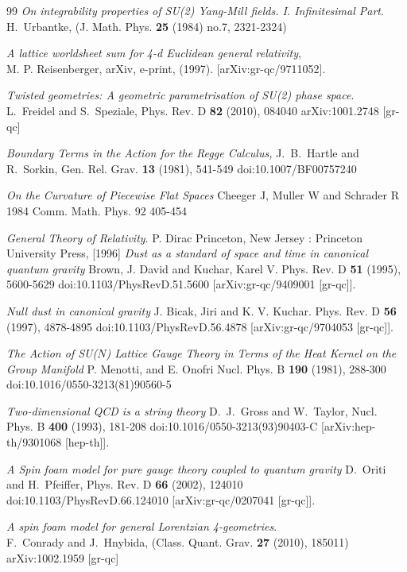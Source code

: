 \documentclass{article}
\begin{document}
\begin{thebibliography}{99}
\emph{On integrability properties of SU(2) Yang-Mill fields. I. Infinitesimal Part}.\\
H.~Urbantke,
(J. Math. Phys. \textbf{25} (1984) no.7, 2321-2324)


\emph{A lattice worldsheet sum for 4-d Euclidean general relativity},\\
M. P. Reisenberger,
arXiv, e-print,
(1997). [arXiv:gr-qc/9711052].


\emph{Twisted geometries: A geometric parametrisation of SU(2) phase space}.\\
L.~Freidel and S.~Speziale,
Phys. Rev. D \textbf{82} (2010), 084040
arXiv:1001.2748 [gr-qc]


\emph{Boundary Terms in the Action for the Regge Calculus,}
J.~B.~Hartle and R.~Sorkin,
Gen. Rel. Grav. \textbf{13} (1981), 541-549
doi:10.1007/BF00757240

\emph{On the Curvature of Piecewise Flat Spaces}
Cheeger J, Muller W and Schrader R 1984
Comm. Math. Phys. 92 405-454

\emph{General Theory of Relativity}.
P. Dirac
Princeton, New Jersey : Princeton University Press, [1996]
\emph{Dust as a standard of space and time in canonical quantum gravity}
Brown, J. David and Kuchar, Karel V.
Phys. Rev. D \textbf{51} (1995), 5600-5629
doi:10.1103/PhysRevD.51.5600
[arXiv:gr-qc/9409001 [gr-qc]].

\emph{Null dust in canonical gravity}
J. Bicak, Jiri and K. V. Kuchar.
Phys. Rev. D \textbf{56} (1997), 4878-4895
doi:10.1103/PhysRevD.56.4878
[arXiv:gr-qc/9704053 [gr-qc]].

\emph{The Action of SU($N$) Lattice Gauge Theory in Terms of the Heat Kernel on the Group Manifold}
P. Menotti, and E. Onofri
Nucl. Phys. B \textbf{190} (1981), 288-300
doi:10.1016/0550-3213(81)90560-5


\emph{Two-dimensional QCD is a string theory}
D.~J.~Gross and W.~Taylor,
Nucl. Phys. B \textbf{400} (1993), 181-208
doi:10.1016/0550-3213(93)90403-C
[arXiv:hep-th/9301068 [hep-th]].

\emph{A Spin foam model for pure gauge theory coupled to quantum gravity}
D.~Oriti and H.~Pfeiffer,
Phys. Rev. D \textbf{66} (2002), 124010
doi:10.1103/PhysRevD.66.124010
[arXiv:gr-qc/0207041 [gr-qc]].

\emph{A spin foam model for general Lorentzian 4-geometries}.\\
F.~Conrady and J.~Hnybida,
(Class. Quant. Grav. \textbf{27} (2010), 185011)
arXiv:1002.1959 [gr-qc]


\end{thebibliography}
\end{document}
